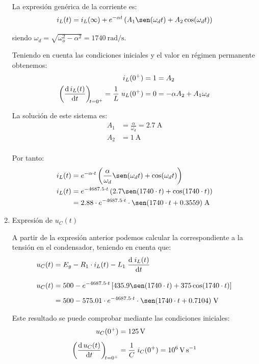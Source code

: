 \begin{enumerate}
  La expresión genérica de la corriente es:
  \[
    i_L(t) = i_L(\infty) + e^{-\alpha t} \left(A_1 \sen(\omega_d t) + A_2 \cos(\omega_d t)\right)
  \]

  siendo $\omega_d = \sqrt{\omega_o^2 - \alpha^2} = \SI{1740}{\radian\per\second}$.

  \vspace{3mm}
  Teniendo en cuenta las condiciones iniciales y el valor en régimen permanente obtenemos:
  \begin{align*}
    i_L(0^+) = 1 &= A_2\\
    \diff{\, i_L(t)}{t}[t = 0^+] = \frac{1}{L} \; u_L(0^+) = 0 &= -\alpha A_2 + A_1 \omega_d
  \end{align*}

  La solución de este sistema es:
  \begin{align*}
    A_1 &= \frac{\alpha}{\omega_d} = \qty{2.7}\ampere\\
    A_2 &= \qty{1}{\ampere}\\
  \end{align*}
  
  Por tanto:
  \begin{align*}
        i_L(t) &= e^{-\alpha \cdot t} \left(\frac{\alpha}{\omega_d} \sen(\omega_d t) + \cos(\omega_d t)\right)\\
    i_L(t) &= e^{-4687.5 \cdot t} \left(2.7 \sen(1740\cdot t) + \cos(1740 \cdot t)\right)\\
               &= 2.88 \cdot e^{-4687.5 \cdot t} \cdot \sen(1740\cdot t + 0.3559) \;\si{\ampere}
  \end{align*}

\vspace{2mm}

\item Expresión de $u_C(t)$

  A partir de la expresión anterior podemos calcular la correspondiente a la tensión en el condensador, teniendo en cuenta que:
  \begin{align*}
    u_C(t) &= E_g - R_1 \cdot i_L(t) - L_1 \; \diff{\; i_L(t)}{t} \\[10pt]
    u_C(t) &= 500 - e^{-4687.5 \cdot t} \left[435.9 \sen(1740\cdot t) + 375 \cos(1740 \cdot t)\right]\\[5pt]
           &= 500 - 575.01 \cdot e^{-4687.5 \cdot t} \cdot  \sen(1740\cdot t + 0.7104)\;\si{\volt}
  \end{align*}

  Este resultado se puede comprobar mediante las condiciones iniciales:
    \begin{align*}
    u_C(0^+) &= \qty{125}{\volt}\\[4pt]
    \diff{\, u_C(t)}{t}[t = 0^+] &= \frac{1}{C} \; i_C(0^+) = 10^6\,\si{\volt\per\second}\\
  \end{align*}

\end{enumerate}



